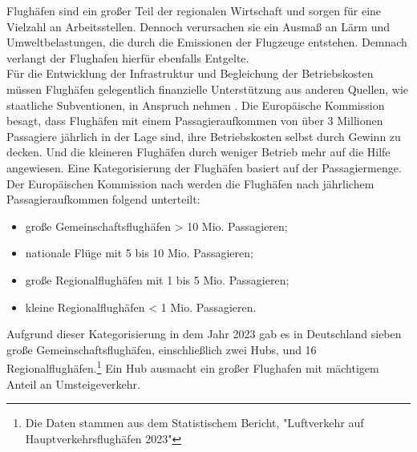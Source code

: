 Flughäfen sind ein großer Teil der regionalen Wirtschaft \cite{schaar2010analysis} und sorgen für eine Vielzahl an Arbeitsstellen. 
Dennoch verursachen sie ein Ausmaß an Lärm und Umweltbelastungen, die durch die Emissionen der Flugzeuge entstehen.
Demnach verlangt der Flughafen hierfür ebenfalls Entgelte. \\ %
%
Für die Entwicklung der Infrastruktur und Begleichung der Betriebskosten müssen Flughäfen gelegentlich finanzielle Unterstützung aus anderen
Quellen, wie staatliche Subventionen, in Anspruch nehmen \cite{schaar2010analysis}.
Die Europäische Kommission besagt, dass Flughäfen mit einem Passagieraufkommen von über 3 Millionen 
Passagiere jährlich in der Lage sind, ihre Betriebskosten selbst durch Gewinn zu decken. %
Und die kleineren Flughäfen durch weniger Betrieb mehr auf die Hilfe angewiesen.
Eine Kategorisierung der Flughäfen basiert auf der Passagiermenge. Der Europäischen Kommission 
nach werden die Flughäfen nach jährlichem Passagieraufkommen folgend unterteilt: 
\begin{itemize}
    \item große Gemeinschaftsflughäfen > 10 Mio. Passagieren;
    \item nationale Flüge mit 5 bis 10 Mio. Passagieren;
    \item große Regionalflughäfen mit 1 bis 5 Mio. Passagieren;
    \item kleine Regionalflughäfen < 1 Mio. Passagieren.
\end{itemize}
Aufgrund dieser Kategorisierung in dem Jahr 2023 gab es in Deutschland 
sieben große Gemeinschaftsflughäfen, einschließlich zwei Hubs, und 16 Regionalflughäfen.\footnote{Die Daten stammen aus dem Statistischem Bericht, "Luftverkehr auf Hauptverkehrsflughäfen 2023"}
Ein Hub ausmacht ein großer Flughafen mit mächtigem Anteil an Umsteigeverkehr.\\

